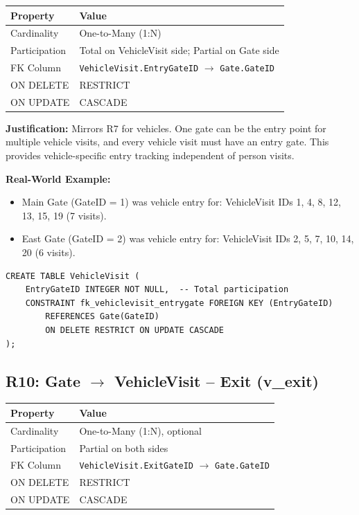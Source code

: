 \documentclass[a4paper, 12pt]{article}
\begin{document}
\begin{table}[H]
\centering
\small
\begin{tabularx}{\textwidth}{l X}
\toprule
\textbf{Property} & \textbf{Value} \\
\midrule
Cardinality & One-to-Many (1:N) \\
Participation & Total on VehicleVisit side; Partial on Gate side \\
FK Column & \texttt{VehicleVisit.EntryGateID} $\rightarrow$ \texttt{Gate.GateID} \\
ON DELETE & RESTRICT \\
ON UPDATE & CASCADE \\
\bottomrule
\end{tabularx}
\end{table}

\textbf{Justification:} Mirrors R7 for vehicles. One gate can be the entry point for multiple vehicle visits, and every vehicle visit must have an entry gate. This provides vehicle-specific entry tracking independent of person visits.

\textbf{Real-World Example:}
\begin{itemize}[leftmargin=*, nosep]
    \item Main Gate (GateID = 1) was vehicle entry for: VehicleVisit IDs 1, 4, 8, 12, 13, 15, 19 (7 visits).
    \item East Gate (GateID = 2) was vehicle entry for: VehicleVisit IDs 2, 5, 7, 10, 14, 20 (6 visits).
\end{itemize}

\begin{lstlisting}[style=sqlstyle, caption={R9 Implementation}, label={lst:r9}]
CREATE TABLE VehicleVisit (
    EntryGateID INTEGER NOT NULL,  -- Total participation
    CONSTRAINT fk_vehiclevisit_entrygate FOREIGN KEY (EntryGateID)
        REFERENCES Gate(GateID)
        ON DELETE RESTRICT ON UPDATE CASCADE
);
\end{lstlisting}

\subsection{R10: Gate \texorpdfstring{$\rightarrow$}{->} VehicleVisit -- Exit (v\_exit)}

\begin{table}[H]
\centering
\small
\begin{tabularx}{\textwidth}{l X}
\toprule
\textbf{Property} & \textbf{Value} \\
\midrule
Cardinality & One-to-Many (1:N), optional \\
Participation & Partial on both sides \\
FK Column & \texttt{VehicleVisit.ExitGateID} $\rightarrow$ \texttt{Gate.GateID} \\
ON DELETE & RESTRICT \\
ON UPDATE & CASCADE \\
\bottomrule
\end{tabularx}
\end{table}
\end{document}
